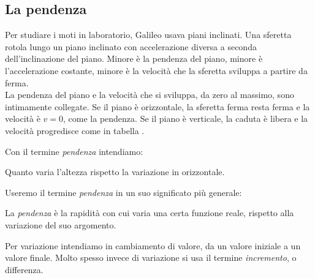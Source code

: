\subsection{La pendenza}
\label{subsec:differenziazione_pendenza}
Per studiare i moti in laboratorio, Galileo usava piani inclinati. 
Una sferetta rotola lungo un piano inclinato con accelerazione diversa a 
seconda dell'inclinazione del piano. 
Minore è la pendenza del piano, minore è l'accelerazione costante, 
minore è la velocità che la sferetta sviluppa a partire da ferma. \\
La pendenza del piano e la velocità che si sviluppa, da zero al massimo, 
sono intimamente collegate. 
Se il piano è orizzontale, la sferetta ferma resta ferma e la velocità è 
\(v=0\), come la pendenza. 
Se il piano è verticale, la caduta è libera e la velocità progredisce 
come in tabella
.

Con il termine \emph{pendenza} intendiamo:
\begin{definizione}
Quanto varia l'altezza rispetto la variazione in orizzontale. 
\end{definizione}


Useremo il termine \emph{pendenza} in un suo significato più generale:
\begin{definizione}
La \emph{pendenza} è la rapidità con cui varia una certa funzione reale, 
rispetto alla variazione del suo argomento. 
\end{definizione}

Per variazione intendiamo in cambiamento di valore, da un valore iniziale a 
un valore finale. 
Molto spesso invece di variazione si usa il termine \emph{incremento}, o 
differenza.

